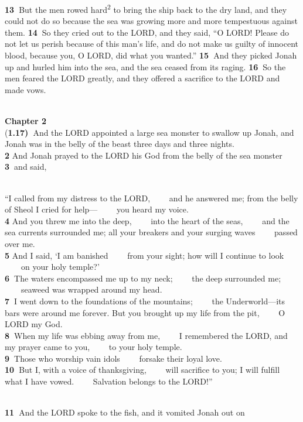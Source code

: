 \documentclass[
]{article}
\begin{document}
\textbf{13~}But the men rowed hard\textsuperscript{2} to bring the ship
back to the dry land, and they could not do so because the sea was
growing more and more tempestuous against them. \textbf{14~}So they
cried out to the LORD, and they said, ``O LORD! Please do not let us
perish because of this man's life, and do not make us guilty of innocent
blood, because you, O LORD, did what you wanted.'' \textbf{15~}And they
picked Jonah up and hurled him into the sea, and the sea ceased from its
raging. \textbf{16~}So the men feared the LORD greatly, and they offered
a sacrifice to the LORD and made vows.\\
\strut \\
\textbf{Chapter 2}\\
(\textbf{1.17)~}And the LORD appointed a large sea monster to swallow up
Jonah, and Jonah was in the belly of the beast three days and three
nights.\\
\textbf{2 }And Jonah prayed to the LORD his God from the belly of the
sea monster \textbf{3~}and said,\\
\strut \\
``I called from my distress to the LORD, ~~~~and he answered me; from
the belly of Sheol I cried for help--- ~~~~you heard my voice.\\
\textbf{4} And you threw me into the deep, ~~~~into the heart of the
seas, ~~~~and the sea currents surrounded me; all your breakers and your
surging waves ~~~~passed over me.\\
\textbf{5} And I said, `I am banished ~~~~from your sight; how will I
continue to look ~~~~on your holy temple?'\\
\textbf{6~}The waters encompassed me up to my neck; ~~~~the deep
surrounded me; ~~~~seaweed was wrapped around my head.\\
\textbf{7~}I went down to the foundations of the mountains; ~~~~the
Underworld---its bars were around me forever. But you brought up my life
from the pit, ~~~~O LORD my God.\\
\textbf{8~}When my life was ebbing away from me, ~~~~I remembered the
LORD, and my prayer came to you, ~~~~to your holy temple.\\
\textbf{9~}Those who worship vain idols ~~~~forsake their loyal love.\\
\textbf{10~}But I, with a voice of thanksgiving, ~~~~will sacrifice to
you; I will fulfill what I have vowed. ~~~~Salvation belongs to the
LORD!''\\
\strut \\
\textbf{11~}And the LORD spoke to the fish, and it vomited Jonah out on
\end{document}

